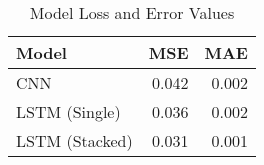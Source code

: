 ﻿\documentclass{article}
\begin{document}
  \begin{table}[h!]
  \begin{centering}
  \begin{tabular}{l | r | r }
    
    Model & MSE & MAE \\
    \hline
    CNN & 0.042 & 0.002 \\
    
    LSTM (Single) & 0.036 & 0.002 \\
    
    LSTM (Stacked) & 0.031 & 0.001
                               
  \end{tabular}
  \caption{Model Loss and Error Values}
  \label{table:1}
  \end{centering}
\end{table}
\end{document}
